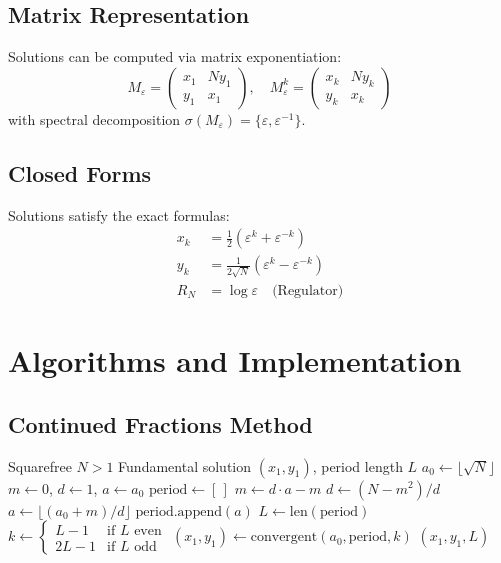\documentclass[12pt]{article}
\begin{document}
\subsection{Matrix Representation}

Solutions can be computed via matrix exponentiation:
\[
M_\varepsilon = \begin{pmatrix}
x_1 & Ny_1 \\
y_1 & x_1
\end{pmatrix}, \quad
M_\varepsilon^k = \begin{pmatrix}
x_k & Ny_k \\
y_k & x_k
\end{pmatrix}
\]
with spectral decomposition $\sigma(M_\varepsilon) = \{\varepsilon, \varepsilon^{-1}\}$.

\subsection{Closed Forms}

Solutions satisfy the exact formulas:
\begin{align*}
x_k &= \tfrac{1}{2}(\varepsilon^k + \varepsilon^{-k}) \\
y_k &= \tfrac{1}{2\sqrt{N}}(\varepsilon^k - \varepsilon^{-k}) \\
R_N &= \log \varepsilon \quad \text{(Regulator)}
\end{align*}

\section{Algorithms and Implementation}

\subsection{Continued Fractions Method}

\begin{algorithm}
\caption{Minimal Solution via Continued Fractions}
\begin{algorithmic}[1]
\Require Squarefree $N > 1$
\Ensure Fundamental solution $(x_1, y_1)$, period length $L$
\State $a_0 \gets \lfloor \sqrt{N} \rfloor$
\State $m \gets 0$, $d \gets 1$, $a \gets a_0$
\State $\text{period} \gets [\,]$
\Repeat
\State $m \gets d \cdot a - m$
\State $d \gets (N - m^2) / d$
\State $a \gets \lfloor (a_0 + m) / d \rfloor$
\State $\text{period}.\text{append}(a)$
\State $L \gets \text{len}(\text{period})$
\State $k \gets \begin{cases}
L-1 & \text{if $L$ even} \\
2L-1 & \text{if $L$ odd}
\end{cases}$
\State $(x_1, y_1) \gets \text{convergent}(a_0, \text{period}, k)$
\State \Return $(x_1, y_1, L)$
\end{algorithmic}
\end{algorithm}
\end{document}
